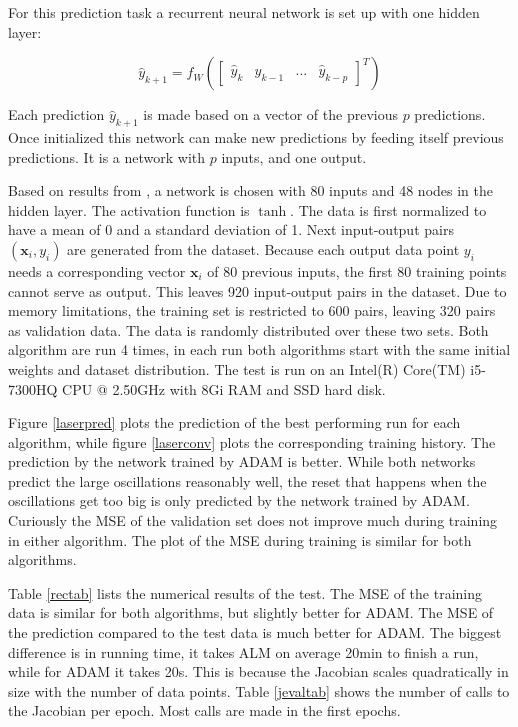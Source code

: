 For this prediction task a recurrent neural network is set up with one hidden layer:

\begin{equation}
\hat{y}_{k+1} = f_W(\begin{bmatrix} \hat{y}_{k} & \hat{y}_{k-1} & ... & \hat{y}_{k-p}\end{bmatrix}^T)
\end{equation}

Each prediction $\hat{y}_{k+1}$ is made based on a vector of the previous $p$ predictions. Once initialized this network can make new predictions by feeding itself previous predictions. It is a network with $p$ inputs, and one output. 

Based on results from \cite{suykens2020}, a network is chosen with 80 inputs and 48 nodes in the hidden layer. The activation function is $\tanh$. The data is first normalized to have a mean of 0 and a standard deviation of 1. Next input-output pairs $(\textbf{x}_i,y_i)$  are generated from the dataset. Because each output data point $y_i$ needs a corresponding vector $\textbf{x}_i$ of 80 previous inputs, the first 80 training points cannot serve as output. This leaves 920 input-output pairs in the dataset. Due to memory limitations, the training set is restricted to 600 pairs, leaving 320 pairs as validation data. The data is randomly distributed over these two sets. Both algorithm are run 4 times, in each run both algorithms start with the same initial weights and dataset distribution. The test is run on an Intel(R) Core(TM) i5-7300HQ CPU @ 2.50GHz with 8Gi RAM and SSD hard disk.

Figure \ref{laserpred} plots the prediction of the best performing run for each algorithm, while figure \ref{laserconv} plots the corresponding training history. The prediction by the network trained by ADAM is better. While both networks predict the large oscillations reasonably well, the reset that happens when the oscillations get too big is only predicted by the network trained by ADAM. Curiously the MSE of the validation set does not improve much during training in either algorithm. The plot of the MSE during training is similar for both algorithms.

Table \ref{rectab} lists the numerical results of the test. The MSE of the training data is similar for both algorithms, but slightly better for ADAM. The MSE of the prediction compared to the test data is much better for ADAM. The biggest difference is in running time, it takes ALM on average 20min to finish a run, while for ADAM it takes 20s. This is because the Jacobian scales quadratically in size with the number of data points. Table \ref{jevaltab} shows the number of calls to the Jacobian per epoch. Most calls are made in the first epochs.


